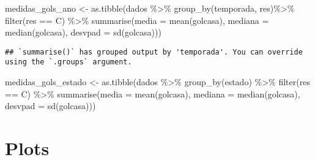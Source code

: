 \documentclass[
]{article}
\newenvironment{Shaded}{\begin{snugshade}}{\end{snugshade}}
\newcommand{\FunctionTok}[1]{\textcolor[rgb]{0.00,0.00,0.00}{#1}}
\newcommand{\NormalTok}[1]{#1}
\newcommand{\OtherTok}[1]{\textcolor[rgb]{0.56,0.35,0.01}{#1}}
\newcommand{\SpecialCharTok}[1]{\textcolor[rgb]{0.00,0.00,0.00}{#1}}
\newcommand{\StringTok}[1]{\textcolor[rgb]{0.31,0.60,0.02}{#1}}
\begin{document}
\begin{Shaded}
\begin{Highlighting}[]
\NormalTok{medidas\_gols\_ano }\OtherTok{\textless{}{-}} \FunctionTok{as.tibble}\NormalTok{(dados }\SpecialCharTok{\%\textgreater{}\%} \FunctionTok{group\_by}\NormalTok{(temporada, res)}\SpecialCharTok{\%\textgreater{}\%}
                                  \FunctionTok{filter}\NormalTok{(res }\SpecialCharTok{==} \StringTok{\textquotesingle{}C\textquotesingle{}}\NormalTok{) }\SpecialCharTok{\%\textgreater{}\%} 
                                  \FunctionTok{summarise}\NormalTok{(}\StringTok{\textquotesingle{}media\textquotesingle{}} \OtherTok{=} \FunctionTok{mean}\NormalTok{(golcasa),}
                                            \StringTok{\textquotesingle{}mediana\textquotesingle{}} \OtherTok{=} \FunctionTok{median}\NormalTok{(golcasa),}
                                            \StringTok{\textquotesingle{}desvpad\textquotesingle{}} \OtherTok{=} \FunctionTok{sd}\NormalTok{(golcasa)))}
\end{Highlighting}
\end{Shaded}

\begin{verbatim}
## `summarise()` has grouped output by 'temporada'. You can override using the `.groups` argument.
\end{verbatim}

\begin{Shaded}
\begin{Highlighting}[]
\NormalTok{medidas\_gols\_estado }\OtherTok{\textless{}{-}} \FunctionTok{as.tibble}\NormalTok{(dados }\SpecialCharTok{\%\textgreater{}\%} \FunctionTok{group\_by}\NormalTok{(estado) }\SpecialCharTok{\%\textgreater{}\%}
                                  \FunctionTok{filter}\NormalTok{(res }\SpecialCharTok{==} \StringTok{\textquotesingle{}C\textquotesingle{}}\NormalTok{) }\SpecialCharTok{\%\textgreater{}\%} 
                                  \FunctionTok{summarise}\NormalTok{(}\StringTok{\textquotesingle{}media\textquotesingle{}} \OtherTok{=} \FunctionTok{mean}\NormalTok{(golcasa),}
                                            \StringTok{\textquotesingle{}mediana\textquotesingle{}} \OtherTok{=} \FunctionTok{median}\NormalTok{(golcasa),}
                                            \StringTok{\textquotesingle{}desvpad\textquotesingle{}} \OtherTok{=} \FunctionTok{sd}\NormalTok{(golcasa)))}
\end{Highlighting}
\end{Shaded}

\hypertarget{plots}{%
\section{Plots}\label{plots}}
\end{document}

